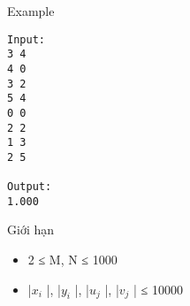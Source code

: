 Example  
\begin{verbatim}
Input:
3 4
4 0
3 2
5 4
0 0
2 2
1 3
2 5

Output:
1.000
\end{verbatim}
   Giới hạn  
\begin{itemize}
	\item     2 ≤ M, N ≤ 1000   
	\item     |$x_{i}$    |, |$y_{i}$    |, |$u_{j}$    |, |$v_{j}$    | ≤ 10000   
\end{itemize}